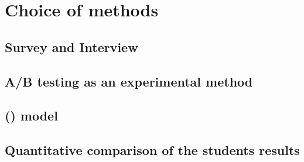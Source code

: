 \chapter{Choice of methods}
\label{chapter4:choice_of_methods}


\section{Survey and Interview}
\label{chapter4:survey_and_interview}


\section{A/B testing as an experimental method}
\label{chapter4:ab_testing_experimental}


\section{ () model}
\label{chapter4:qa_model}

\section{Quantitative comparison of the students results}
\label{chapter4:quantitative_comparison}


